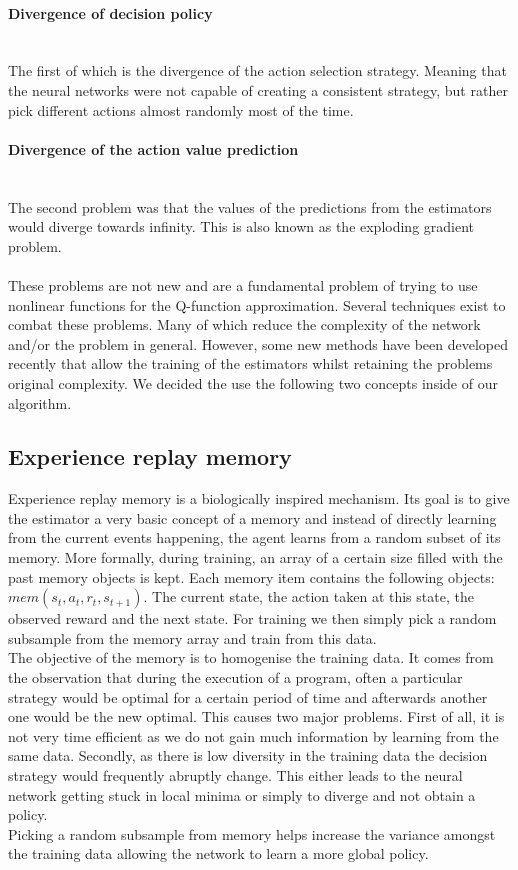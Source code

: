 \paragraph{Divergence of decision policy}\mbox{}\\
The first of which is the divergence of the action selection strategy. Meaning that the neural networks were not capable of creating a consistent strategy, but rather pick different actions almost randomly most of the time.
\paragraph{Divergence of the action value prediction}\mbox{}\\
The second problem was that the values of the predictions from the estimators would diverge towards infinity. This is also known as the exploding gradient problem.\\
\mbox{}\\
These problems are not new and are a fundamental problem of trying to use nonlinear functions for the Q-function approximation. Several techniques exist to combat these problems. Many of which reduce the complexity of the network and/or the problem in general. However, some new methods have been developed recently that allow the training of the estimators whilst retaining the problems original complexity. We decided the use the following two concepts inside of our algorithm.
\subsection{Experience replay memory}
Experience replay memory \cite{Mnih2015} is a biologically inspired mechanism. Its goal is to give the estimator a very basic concept of a memory and instead of directly learning from the current events happening, the agent learns from a random subset of its memory. More formally, during training, an array of a certain size filled with the past memory objects is kept. Each memory item contains the following objects: $mem(s_t, a_t, r_t, s_{t+1})$. The current state, the action taken at this state, the observed reward and the next state. For training we then simply pick a random subsample from the memory array and train from this data.
\\
The objective of the memory is to homogenise the training data. It comes from the observation that during the execution of a program, often a particular strategy would be optimal for a certain period of time and afterwards another one would be the new optimal. This causes two major problems. First of all, it is not very time efficient as we do not gain much information by learning from the same data. Secondly, as there is low diversity in the training data the decision strategy would frequently abruptly change. This either leads to the neural network getting stuck in local minima or simply to diverge and not obtain a policy. \\
Picking a random subsample from memory helps increase the variance amongst the training data allowing the network to learn a more global policy. 

